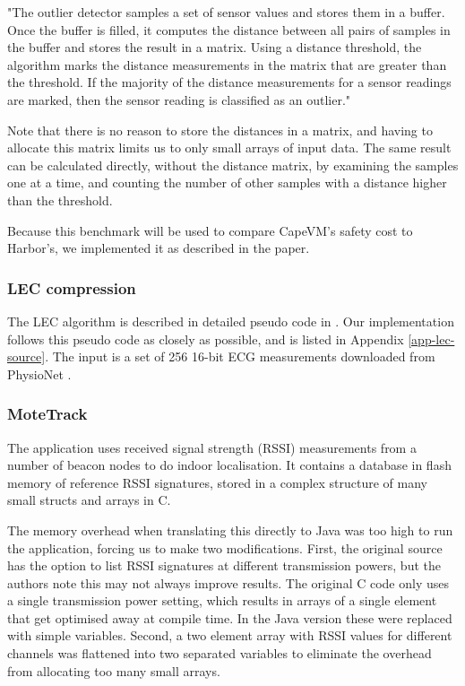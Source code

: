 \begin{displayquote}
"The outlier detector samples a set of sensor values and stores them in a buffer. Once the buffer is filled, it computes the distance between all pairs of samples in the buffer and stores the result in a matrix. Using a distance threshold, the algorithm marks the distance measurements in the matrix that are greater than the threshold. If the majority of the distance measurements for a sensor readings are marked, then the sensor reading is classified as an outlier."
\end{displayquote}

Note that there is no reason to store the distances in a matrix, and having to allocate this matrix limits us to only small arrays of input data. The same result can be calculated directly, without the distance matrix, by examining the samples one at a time, and counting the number of other samples with a distance higher than the threshold.

Because this benchmark will be used to compare CapeVM's safety cost to Harbor's, we implemented it as described in the paper.

\subsubsection{LEC compression}
The LEC algorithm is described in detailed pseudo code in \cite{Marcelloni:2009ja}. Our implementation follows this pseudo code as closely as possible, and is listed in Appendix \ref{app-lec-source}. The input is a set of 256 16-bit ECG measurements downloaded from PhysioNet \cite{physionet-ecg-data}.

\subsubsection{MoteTrack}
\label{sec-evaluation-benchmark-implementation-motetrack}
The  application uses received signal strength (RSSI) measurements from a number of beacon nodes to do indoor localisation. It contains a database in flash memory of reference RSSI signatures, stored in a complex structure of many small structs and arrays in C.

The memory overhead when translating this directly to Java was too high to run the application, forcing us to make two modifications. First, the original source has the option to list RSSI signatures at different transmission powers, but the authors note this may not always improve results. The original C code only uses a single transmission power setting, which results in arrays of a single element that get optimised away at compile time. In the Java version these were replaced with simple variables. Second, a two element array with RSSI values for different channels was flattened into two separated variables to eliminate the overhead from allocating too many small arrays.


